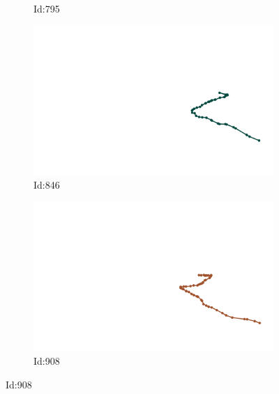 \documentclass[12pt,twoside]{report}
\begin{document}
\begin{figure}
\begin{subfigure}[b]{0.20\textwidth}
\caption{Id:795}
\end{subfigure}
\begin{subfigure}[b]{0.20\textwidth}
\centering
\includegraphics[width=\textwidth]{../../trajectories/846.png}
\caption{Id:846}
\end{subfigure}
\begin{subfigure}[b]{0.20\textwidth}
\centering
\includegraphics[width=\textwidth]{../../trajectories/908.png}
\caption{Id:908}
\end{subfigure}
\end{figure}
\end{document}

